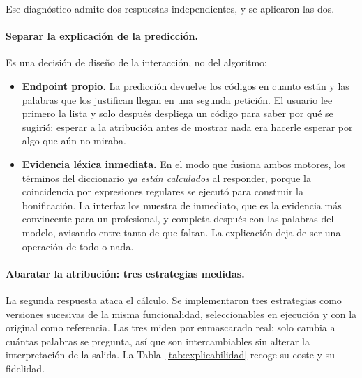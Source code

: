 Ese diagnóstico admite dos respuestas independientes, y se aplicaron las dos.


\paragraph{Separar la explicación de la predicción.}
Es una decisión de diseño de la interacción, no del algoritmo:

\begin{itemize}
 \item \textbf{Endpoint propio.} La predicción devuelve los códigos en cuanto están y las palabras que los justifican llegan en una segunda petición. El usuario lee primero la lista y solo después despliega un código para saber por qué se sugirió: esperar a la atribución antes de mostrar nada era hacerle esperar por algo que aún no miraba.
 \item \textbf{Evidencia léxica inmediata.} En el modo que fusiona ambos motores, los términos del diccionario \emph{ya están calculados} al responder, porque la coincidencia por expresiones regulares se ejecutó para construir la bonificación. La interfaz los muestra de inmediato, que es la evidencia más convincente para un profesional, y completa después con las palabras del modelo, avisando entre tanto de que faltan. La explicación deja de ser una operación de todo o nada.
\end{itemize}


\paragraph{Abaratar la atribución: tres estrategias medidas.}
La segunda respuesta ataca el cálculo. Se implementaron tres estrategias como versiones sucesivas de la misma funcionalidad, seleccionables en ejecución y con la original como referencia. Las tres miden por enmascarado real; solo cambia a cuántas palabras se pregunta, así que son intercambiables sin alterar la interpretación de la salida. La Tabla~\ref{tab:explicabilidad} recoge su coste y su fidelidad.

